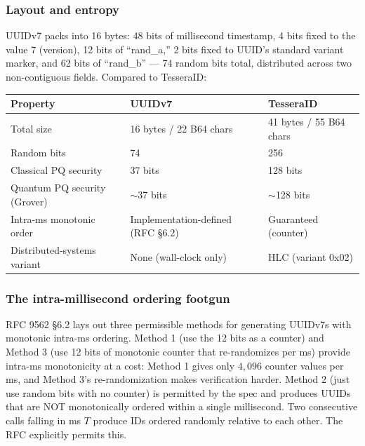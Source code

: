 \subsubsection{Layout and entropy}

UUIDv7 packs into 16 bytes: 48 bits of millisecond timestamp, 4 bits fixed to the value 7 (version), 12 bits of ``rand\_a,'' 2 bits fixed to UUID's standard variant marker, and 62 bits of ``rand\_b'' --- 74 random bits total, distributed across two non-contiguous fields. Compared to TesseraID:

\begin{center}
\renewcommand{\arraystretch}{1.15}
\begin{tabular}{lll}
\toprule
\textbf{Property} & \textbf{UUIDv7} & \textbf{TesseraID} \\
\midrule
Total size                  & 16 bytes / 22 B64 chars       & 41 bytes / 55 B64 chars \\
Random bits                 & 74                            & 256 \\
Classical PQ security       & 37 bits                       & 128 bits \\
Quantum PQ security (Grover)& $\sim$37 bits                 & $\sim$128 bits \\
Intra-ms monotonic order    & Implementation-defined (RFC §6.2) & Guaranteed (counter) \\
Distributed-systems variant & None (wall-clock only)        & HLC (variant 0x02) \\
\bottomrule
\end{tabular}
\end{center}

\subsubsection{The intra-millisecond ordering footgun}

RFC 9562 §6.2 lays out three permissible methods for generating UUIDv7s with monotonic intra-ms ordering. Method 1 (use the 12  bits as a counter) and Method 3 (use 12 bits of monotonic counter that re-randomizes per ms) provide intra-ms monotonicity at a cost: Method 1 gives only $4{,}096$ counter values per ms, and Method 3's re-randomization makes verification harder. Method 2 (just use random bits with no counter) is permitted by the spec and produces UUIDs that are NOT monotonically ordered within a single millisecond. Two consecutive calls falling in ms $T$ produce IDs ordered randomly relative to each other. The RFC explicitly permits this.

